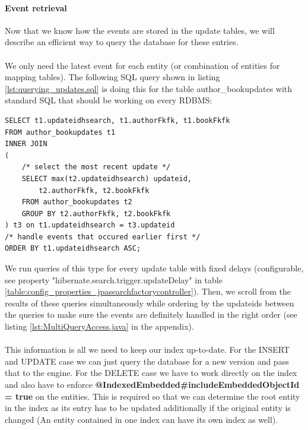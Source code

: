 \pagebreak

\paragraph{Event retrieval}
Now that we know how the events are stored in the update tables, we will describe an efficient way to query the database for these entries.
\\\\
We only need the latest event for each entity (or combination of entities for mapping tables). The following SQL query shown in listing \ref{lst:querying_updates.sql} is doing this for the table author\_bookupdates with standard SQL that should be working on every RDBMS:
\\
\lstset{language=sql}
\begin{lstlisting}[frame=htrbl, caption={Querying for updates (Author\_Book)},
label={lst:querying_updates.sql}]
SELECT t1.updateidhsearch, t1.authorFkfk, t1.bookFkfk
FROM author_bookupdates t1
INNER JOIN
(
	/* select the most recent update */
	SELECT max(t2.updateidhsearch) updateid, 
		t2.authorFkfk, t2.bookFkfk
	FROM author_bookupdates t2
	GROUP BY t2.authorFkfk, t2.bookFkfk
) t3 on t1.updateidhsearch = t3.updateid
/* handle events that occured earlier first */
ORDER BY t1.updateidhsearch ASC;
\end{lstlisting}
\noindent
We run queries of this type for every update table with fixed delays (configurable, see property "hibernate.search.trigger.updateDelay" in table \ref{table:config_properties_jpasearchfactorycontroller}). Then, we scroll from the results
of these queries simultaneously while ordering by the updateids between the queries to make sure the events are definitely handled in the right order (see listing \ref{lst:MultiQueryAccess.java} in the appendix).
\\\\
This information is all we need to keep our index up-to-date. For the INSERT and UPDATE case we can just query the database for a new version and pass that to the engine. For the DELETE case we have to work directly on the index and also have to enforce  \textbf{@IndexedEmbedded\#includeEmbeddedObjectId = true} on the entities. This is required so that we can determine the root entity in the index as its entry has to be updated additionally if the original entity is changed (An entity contained in one index can have its own index as well).

